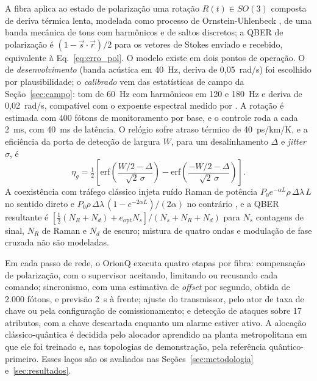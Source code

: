 \documentclass[12pt]{article}
\providecommand{\citeasnoun}[1]{\cite{#1}}
\begin{document}
\label{sec:fibra}
A fibra aplica ao estado de polarização uma rotação $R(t)\in SO(3)$ composta de
deriva térmica lenta, modelada como processo de Ornstein-Uhlenbeck
\cite{uhlenbeck1930}, de uma banda mecânica de tons com harmônicos e de saltos
discretos; a QBER de polarização é $(1-\vec s\cdot\vec r)/2$ para os vetores de
Stokes enviado e recebido, equivalente à Eq.~\ref{eq:erro_pol}. O modelo existe
em dois pontos de operação. O de \textit{desenvolvimento} (banda acústica em
40~Hz, deriva de 0,05~rad/s) foi escolhido por plausibilidade; o
\textit{calibrado} vem das estatísticas de campo da Seção~\ref{sec:campo}: tom de
60~Hz com harmônicos em 120 e 180~Hz \cite{peterson2004} e deriva de 0,02~rad/s,
compatível com o expoente espectral medido por \citeasnoun{ramaswamy2026}. A
rotação é estimada com 400 fótons de monitoramento por base, e o controle roda a
cada 2~ms, com 40~ms de latência. O relógio sofre atraso térmico de
40~ps/km/K, e a eficiência da porta de detecção de largura $W$, para um
desalinhamento $\Delta$ e \textit{jitter} $\sigma$, é
\begin{equation}
\eta_g=\tfrac12\left[\mathrm{erf}\!\left(\frac{W/2-\Delta}{\sqrt2\,\sigma}\right)-\mathrm{erf}\!\left(\frac{-W/2-\Delta}{\sqrt2\,\sigma}\right)\right].
\label{eq:porta}
\end{equation}
A coexistência com tráfego clássico injeta ruído Raman de potência
$P_0e^{-\alpha L}\rho\,\Delta\lambda\,L$ no sentido direto e
$P_0\rho\,\Delta\lambda\,(1-e^{-2\alpha L})/(2\alpha)$ no contrário
\cite{chapuran2009,eraerds2010,peters2009}, e a QBER resultante é
$[\tfrac12(N_R+N_d)+e_{\mathrm{opt}}N_s]/(N_s+N_R+N_d)$ para $N_s$ contagens de
sinal, $N_R$ de Raman e $N_d$ de escuro; mistura de quatro ondas e modulação de
fase cruzada não são modeladas.

Em cada passo de rede, o OrionQ executa quatro etapas por fibra: compensação de
polarização, com o supervisor aceitando, limitando ou recusando cada comando;
sincronismo, com uma estimativa de \textit{offset} por segundo, obtida de 2.000
fótons, e previsão 2~s à frente; ajuste do transmissor, pelo ator de taxa de
chave ou pela configuração de comissionamento; e detecção de ataques sobre 17
atributos, com a chave descartada enquanto um alarme estiver ativo. A alocação
clássico-quântica é decidida pelo alocador aprendido na planta metropolitana em
que ele foi treinado e, nas topologias de demonstração, pela referência
quântico-primeiro. Esses laços são os avaliados nas
Seções~\ref{sec:metodologia} e~\ref{sec:resultados}.
\end{document}
